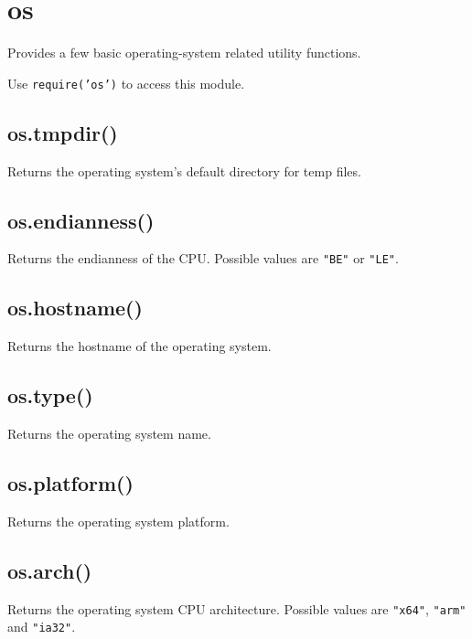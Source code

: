 \section{os}

\begin{Shaded}
\begin{Highlighting}[]
\NormalTok{: } 
\end{Highlighting}
\end{Shaded}

Provides a few basic operating-system related utility functions.

Use \texttt{require('os')} to access this module.

\subsection{os.tmpdir()}

Returns the operating system's default directory for temp files.

\subsection{os.endianness()}

Returns the endianness of the CPU. Possible values are \texttt{"BE"} or
\texttt{"LE"}.

\subsection{os.hostname()}

Returns the hostname of the operating system.

\subsection{os.type()}

Returns the operating system name.

\subsection{os.platform()}

Returns the operating system platform.

\subsection{os.arch()}

Returns the operating system CPU architecture. Possible values are
\texttt{"x64"}, \texttt{"arm"} and \texttt{"ia32"}.

